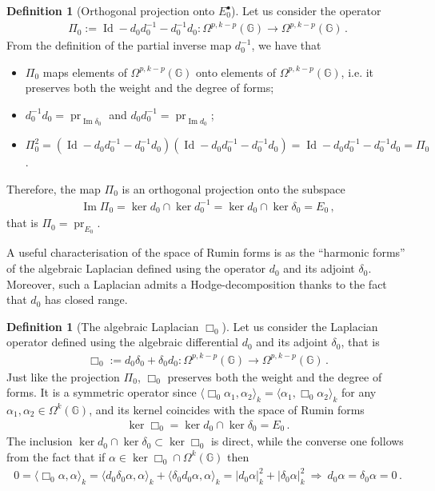 \documentclass[dvipsnames]{amsart}
\theoremstyle{definition}
\newtheorem{definition}[theorem]{Definition}
\theoremstyle{definition}
\numberwithin{equation}{section}
\newcommand{\G}{\mathbb{G}}
\begin{document}
\begin{definition}[Orthogonal projection onto $E_0^\bullet$]\label{def: Pi_0} Let us consider the operator 
\begin{align*}
    \Pi_0:=\operatorname{Id}-d_0d_0^{-1}-d_0^{-1}d_0\colon\Omega^{p,k-p}(\G)\to\Omega^{p,k-p}(\G)\,.
\end{align*}
From the definition of the partial inverse map $d_0^{-1}$, we have that
\begin{itemize}
    \item $\Pi_0$ maps elements of $\Omega^{p,k-p}(\G)$ onto elements of $\Omega^{p,k-p}(\G)$, i.e. it preserves both the weight and the degree of forms;
    \item $d_0^{-1}d_0=\operatorname{pr}_{\operatorname{Im}\delta_0}$ and $d_0d_0^{-1}=\operatorname{pr}_{\operatorname{Im}d_0}$;
    \item $\Pi_0^2=(\operatorname{Id}-d_0d_0^{-1}-d_0^{-1}d_0)(\operatorname{Id}-d_0d_0^{-1}-d_0^{-1}d_0)=\operatorname{Id}-d_0d_0^{-1}-d_0^{-1}d_0=\Pi_0$.
\end{itemize}
Therefore, the map $\Pi_0$ is an orthogonal projection onto the subspace
\begin{align*}
    \operatorname{Im}\Pi_0=\ker d_0\cap\ker d_0^{-1}=\ker d_0\cap\ker\delta_0=E_0\,,
\end{align*}
that is $\Pi_0=\operatorname{pr}_{E_0}$.
\end{definition}
A useful characterisation of the space of Rumin forms is as the ``harmonic forms'' of the algebraic Laplacian defined using the operator $d_0$ and its adjoint $\delta_0$. Moreover, such a Laplacian admits a Hodge-decomposition thanks to the fact that $d_0$ has closed range.
\begin{definition}[The algebraic Laplacian $\Box_0$]\label{def: box 0} Let us consider the Laplacian operator defined using the algebraic differential $d_0$ and its adjoint $\delta_0$, that is
\begin{align*}
    \Box_0:=d_0\delta_0+\delta_0d_0\colon\Omega^{p,k-p}(\G)\longrightarrow\Omega^{p,k-p}(\G)\,.
\end{align*}
Just like the projection $\Pi_0$, $\Box_0$ preserves both the weight and the degree of forms. It is a symmetric operator since $\langle \Box_0\alpha_1,\alpha_2\rangle_k=\langle\alpha_1,\Box_0\alpha_2\rangle_k$ for any $\alpha_1,\alpha_2\in\Omega^k(\G)$, and its kernel coincides with the space of Rumin forms
\begin{align*}
    \ker\Box_0=\ker d_0\cap\ker\delta_0=E_0\,.
\end{align*}
The inclusion $\ker d_0\cap\ker \delta_0\subset\ker\Box_0$ is direct, while the converse one follows from the fact that if $\alpha\in\ker\Box_0\cap\Omega^k(\G)$ then
\begin{align*}
    0=\langle\Box_0\alpha,\alpha\rangle_k=\langle d_0\delta_0\alpha,\alpha\rangle_k+\langle\delta_0d_0\alpha,\alpha\rangle_k=|d_0\alpha|^2_k+|\delta_0\alpha|^2_k\ \Longrightarrow\ d_0\alpha=\delta_0\alpha=0\,.
\end{align*}
\end{definition}
\end{document}
